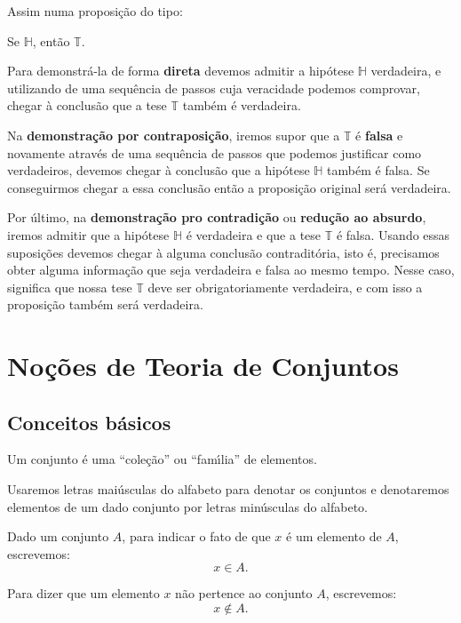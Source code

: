 Assim numa proposi\c{c}\~ao do tipo:
\begin{center}
	Se $\mathbb{H}$, ent\~ao $\mathbb{T}$.
\end{center}

Para demonstr\'a-la de forma \textbf{direta} devemos admitir a hip\'otese $\mathbb{H}$ verdadeira, e utilizando de uma sequ\^encia de passos cuja veracidade podemos comprovar, chegar \`a conclus\~ao que a tese $\mathbb{T}$ tamb\'em \'e verdadeira.

Na \textbf{demonstra\c{c}\~ao por contraposi\c{c}\~ao}, iremos supor que a $\mathbb{T}$ \'e \textbf{falsa} e novamente atrav\'es de uma sequ\^encia de passos que podemos justificar como verdadeiros, devemos chegar \`a conclus\~ao que a hip\'otese $\mathbb{H}$ tamb\'em \'e falsa. Se conseguirmos chegar a essa conclus\~ao ent\~ao a proposi\c{c}\~ao original ser\'a verdadeira.

Por \'ultimo, na \textbf{demonstra\c{c}\~ao pro contradi\c{c}\~ao} ou \textbf{redu\c{c}\~ao ao absurdo}, iremos admitir que a hip\'otese $\mathbb{H}$ \'e verdadeira e que a tese $\mathbb{T}$ \'e falsa. Usando essas suposi\c{c}\~oes devemos chegar \`a alguma conclus\~ao contradit\'oria, isto \'e, precisamos obter alguma informa\c{c}\~ao que seja verdadeira e falsa ao mesmo tempo. Nesse caso, significa que nossa tese $\mathbb{T}$ deve ser obrigatoriamente verdadeira, e com isso a proposi\c{c}\~ao tamb\'em ser\'a verdadeira.



\chapter{No{\c c}{\~o}es de Teoria de Conjuntos}
\section{Conceitos b{\'a}sicos}

Um conjunto {\'e} uma ``cole{\c c}{\~a}o'' ou ``fam{\'\i}lia'' de elementos.

Usaremos letras mai{\'u}sculas do alfabeto para denotar os conjuntos e denotaremos elementos de um dado conjunto por letras min{\'u}sculas do alfabeto.

Dado um conjunto $A$, para indicar o fato de que $x$ {\'e} um elemento de $A$, escrevemos:
\[
x \in A.
\]

Para dizer que um elemento $x$ n{\~a}o pertence ao conjunto $A$, escrevemos:
\[
x \notin A.
\]

